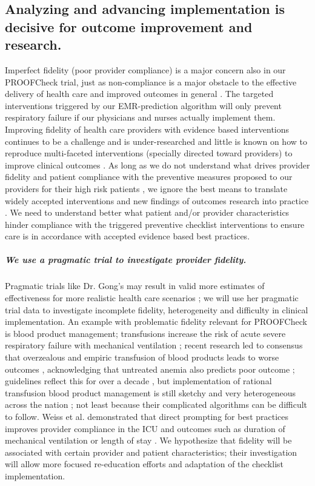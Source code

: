 \documentclass[11pt,notitlepage]{article}
\begin{document}
\subsection*{Analyzing and advancing implementation is decisive for outcome improvement and research.}
Imperfect fidelity (poor provider compliance) is a major concern also in our PROOFCheck trial, just as non-compliance is a major obstacle to the effective delivery of health care and improved outcomes in general
\cite{Duncan_16710766}. The targeted interventions triggered by our EMR-prediction algorithm will only prevent respiratory failure if our physicians and nurses actually implement them. Improving fidelity of health care providers with evidence based interventions continues to be a challenge and is under-researched \cite{Davis_7650822} and little is known on how to reproduce multi-faceted interventions (specially directed toward providers) to improve clinical outcomes \cite{Campbell_10987780}. As long as we do not understand what drives provider fidelity and patient compliance with the preventive measures proposed to our providers for their high risk patients  \cite{Mittman_15172904}, we ignore the best means to translate widely accepted interventions and new findings of outcomes research into practice \cite{Glasgow_17150029}. We need to understand better what patient and/or provider characteristics hinder compliance with the triggered preventive checklist interventions to ensure care is in accordance with accepted evidence based best practices.

\subparagraph*{We use a pragmatic trial to investigate provider fidelity.} Pragmatic trials like Dr. Gong's may result in valid more estimates of effectiveness for more realistic health care scenarios \cite{Selby_22824225,Tosh_21842618}; we will use her pragmatic trial data to investigate incomplete fidelity, heterogeneity and difficulty in clinical implementation. An example with problematic fidelity relevant for PROOFCheck is blood product management; transfusions increase the risk of acute severe respiratory failure with mechanical ventilation \cite{Kenz_24892308};  recent research led to consensus that overzealous and empiric transfusion of blood products leads to worse outcomes \cite{Hebert_9971864}, acknowledging that untreated anemia also predicts poor outcome \cite{Ranucci_22698773}; guidelines reflect this for over a decade \cite{ASA_25545654}, but implementation of rational transfusion blood product management is still sketchy and very heterogeneous across the nation \cite{Likosky_20488928}; not least because their complicated algorithms can be difficult to follow. Weiss et al. demonstrated that direct prompting for best practices improves provider compliance in the ICU and outcomes such as duration of mechanical ventilation or length of stay \cite{Weiss_21616996}. We hypothesize that fidelity will be associated with certain provider and patient characteristics; their investigation will allow more focused re-education efforts and adaptation of the checklist implementation. 
\end{document}
